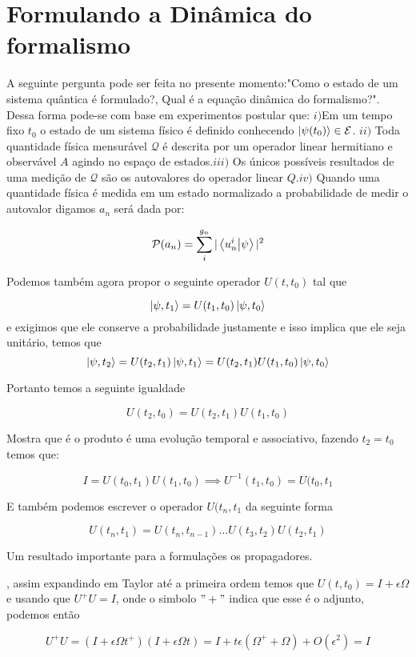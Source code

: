 \documentclass{article}
\begin{document}
	\section{Formulando a Dinâmica do formalismo}
	A seguinte pergunta pode ser feita no presente momento:"Como o estado de um sistema quântica é formulado?, Qual é a equação dinâmica do formalismo?". Dessa forma pode-se com base em experimentos postular que: \(i)\)Em um tempo fixo \(t_0\) o estado de um sistema físico é definido conhecendo \(\ket{\psi(t_0)} \in \mathcal{E}\). \(ii)\) Toda quantidade física mensurável $\mathcal{Q}$ é descrita por um operador linear hermitiano e observável $A$ agindo no espaço de estados.$iii)$ Os únicos possíveis resultados de uma medição de $\mathcal{Q}$ são os autovalores do operador linear $Q$.$iv)$ Quando uma quantidade física é medida em um estado normalizado a probabilidade de medir o autovalor digamos \(a_n\) será dada por:
	
	\[\mathcal{P}(a_n)=\sum^{g_n}_i|\braket{u^i_n}{\psi}|^2\]
	
	
	
	Podemos também agora propor o seguinte operador \(U(t,t_0)\) tal que 
	
	\[\ket{\psi,t_1}=U(t_1,t_0)\ket{\psi,t_0}\] e exigimos que ele conserve a probabilidade justamente e isso implica que ele seja unitário, temos que 
	\[\ket{\psi,t_2}=U(t_2,t_1)\ket{\psi,t_1}=U(t_2,t_1)U(t_1,t_0)\ket{\psi,t_0}\]
	
	Portanto temos a seguinte igualdade
	
	\[U(t_2,t_0)=U(t_2,t_1)U(t_1,t_0)\]
	
	Mostra que é o produto é uma evolução temporal e associativo, fazendo \(t_2=t_0\) temos que:
	
	\[I=U(t_0,t_1)U(t_1,t_0) \implies U^{-1}(t_1,t_0)=U(t_0,t_1\]
	
	E também podemos escrever o operador \(U(t_n,t_1\) da seguinte forma 
	
	\[U(t_n,t_1)=U(t_n,t_{n-1}) \dots U(t_3,t_2)U(t_2,t_1)\]
	
	
	Um resultado importante para a formulações os propagadores.
	
	
	
	, assim expandindo em Taylor até a primeira ordem  temos que \(U(t,t_0)=I+\epsilon\Omega\) e usando  que \(U^+U=I\), onde o simbolo \("+"\) indica que esse é o adjunto, podemos então 
	
	\[U^+U=(I+\epsilon\Omega t^+)(I+\epsilon\Omega t )=I+ t\epsilon(\Omega^++\Omega)+O(\epsilon^2)=I\]
	
\end{document}
